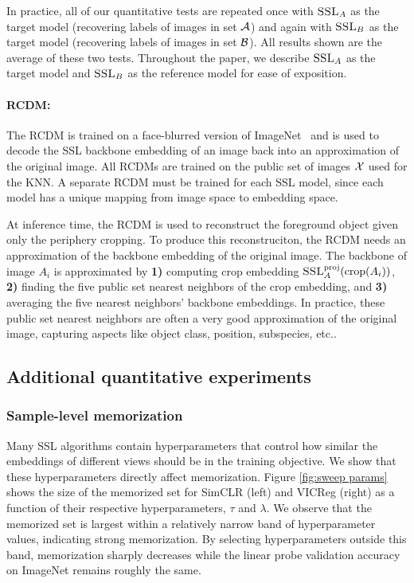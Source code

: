 In practice, all of our quantitative tests are repeated once with $\textsc{SSL}_A$ as the target model (recovering labels of images in set $\mathcal{A}$) and again with $\textsc{SSL}_B$ as the target model (recovering labels of images in set $\mathcal{B}$). All results shown are the average of these two tests. Throughout the paper, we describe $\textsc{SSL}_A$ as the target model and $\textsc{SSL}_B$ as the reference model for ease of exposition. 

\paragraph{RCDM:} The RCDM is trained on a face-blurred version of ImageNet~\citep{imagenet} and is used to decode the SSL backbone embedding of an image back into an approximation of the original image. All RCDMs are trained on the public set of images $\mathcal{X}$ used for the KNN. A separate RCDM must be trained for each SSL model, since each model has a unique mapping from image space to embedding space. 

At inference time, the RCDM is used to reconstruct the foreground object given only the periphery cropping. To produce this reconstruciton, the RCDM needs an approximation of the backbone embedding of the original image. The backbone of image $A_i$ is approximated by \textbf{1)} computing crop embedding $\textsc{SSL}^\mathrm{proj}_A(\mathrm{crop}({A_i}))$, \textbf{2)} finding the five public set nearest neighbors of the crop embedding, and \textbf{3)} averaging the five nearest neighbors' backbone embeddings. In practice, these public set nearest neighbors are often a very good approximation of the original image, capturing aspects like object class, position, subspecies, etc..  

\clearpage

\subsection{Additional quantitative experiments}
\label{sec:appx quantitative}

\subsubsection{Sample-level memorization}

 
Many SSL algorithms contain hyperparameters that control how similar the embeddings of different views should be in the training objective. 
We show that these hyperparameters directly affect \dejavu memorization. Figure \ref{fig:sweep params} shows the size of the memorized set for SimCLR (left) and VICReg (right) as a function of their respective hyperparameters, $\tau$ and $\lambda$. We observe that the memorized set is largest within a relatively narrow band of hyperparameter values, indicating strong \dejavu memorization. By selecting hyperparameters outside this band, \dejavu memorization sharply decreases while the linear probe validation accuracy on ImageNet remains roughly the same.


